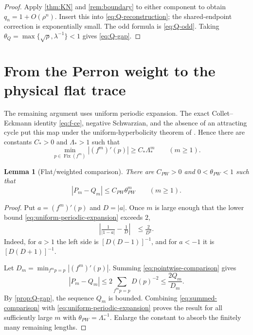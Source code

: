 \documentclass[11pt]{article}
\newtheorem{lemma}[theorem]{Lemma}
\theoremstyle{definition}
\theoremstyle{remark}
\newcommand{\Fix}{\operatorname{Fix}}
\begin{document}
\begin{proof}
Apply \cref{thm:KN} and \cref{rem:boundary} to either component to obtain
$q_n=1+O(\rho^n)$.  Insert this into
\eqref{eq:Q-reconstruction}; the shared-endpoint correction is exponentially
small.  The odd formula is \eqref{eq:Q-odd}.  Taking
$\theta_Q=\max\{\sqrt\rho,\lambda^{-1}\}<1$ gives \eqref{eq:Q-gap}.
\end{proof}

\section{From the Perron weight to the physical flat trace}
\label{sec:comparison}

The remaining argument uses uniform periodic expansion.  The exact
Collet--Eckmann identity \eqref{eq:f-ce}, negative Schwarzian, and the absence
of an attracting cycle put this map under the uniform-hyperbolicity theorem of
\citet{Nowicki1988}.  Hence there are constants $C_*>0$ and $\Lambda_*>1$ such
that
\begin{equation}\label{eq:uniform-periodic-expansion}
 \min_{p\in\Fix(f^m)}|(f^m)'(p)|
 \ge C_*\Lambda_*^m
 \qquad(m\ge1).
\end{equation}

\begin{lemma}[Flat/weighted comparison]
\label{lem:flat-weighted}
There are $C_{PW}>0$ and $0<\theta_{PW}<1$ such that
\begin{equation}\label{eq:flat-weighted-gap}
 |P_m-Q_m|\le C_{PW}\theta_{PW}^m
 \qquad(m\ge1).
\end{equation}
\end{lemma}

\begin{proof}
Put $a=(f^m)'(p)$ and $D=|a|$.  Once $m$ is large enough that the lower bound
\eqref{eq:uniform-periodic-expansion} exceeds $2$,
\begin{align}
 \left|\frac1{|1-a|}-\frac1D\right|
 &\le\frac{2}{D^2}.
 \label{eq:pointwise-comparison}
\end{align}
Indeed, for $a>1$ the left side is $[D(D-1)]^{-1}$, and for $a<-1$ it is
$[D(D+1)]^{-1}$.

Let $D_m=\min_{f^m p=p}|(f^m)'(p)|$.  Summing
\eqref{eq:pointwise-comparison} gives
\begin{equation}\label{eq:summed-comparison}
 |P_m-Q_m|
 \le2\sum_{f^m p=p}D(p)^{-2}
 \le\frac{2Q_m}{D_m}.
\end{equation}
By \cref{prop:Q-gap}, the sequence $Q_m$ is bounded.  Combining
\eqref{eq:summed-comparison} with \eqref{eq:uniform-periodic-expansion} proves
the result for all sufficiently large $m$ with
$\theta_{PW}=\Lambda_*^{-1}$.  Enlarge the constant to absorb the finitely
many remaining lengths.
\end{proof}
\end{document}
